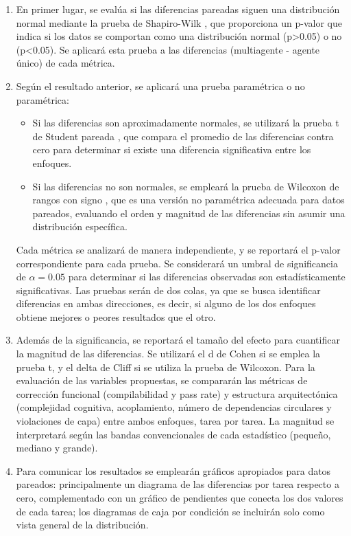 \begin{enumerate}
  \item En primer lugar, se evalúa si las diferencias pareadas siguen una distribución normal mediante la prueba de Shapiro-Wilk \parencite{shapiro1965analysis}, que proporciona un p-valor que indica si los datos se comportan como una distribución normal (p>0.05) o no (p<0.05). Se aplicará esta prueba a las diferencias (multiagente - agente único) de cada métrica.
  \item Según el resultado anterior, se aplicará una prueba paramétrica o no paramétrica:
  \begin{itemize}
    \item Si las diferencias son aproximadamente normales, se utilizará la prueba t de Student pareada \parencite{student1908probable}, que compara el promedio de las diferencias contra cero para determinar si existe una diferencia significativa entre los enfoques.
    \item Si las diferencias no son normales, se empleará la prueba de Wilcoxon de rangos con signo \parencite{wilcoxon1945individual}, que es una versión no paramétrica adecuada para datos pareados, evaluando el orden y magnitud de las diferencias sin asumir una distribución específica.
  \end{itemize}
  Cada métrica se analizará de manera independiente, y se reportará el p-valor correspondiente para cada prueba. Se considerará un umbral de significancia de $\alpha = 0.05$ para determinar si las diferencias observadas son estadísticamente significativas. Las pruebas serán de dos colas, ya que se busca identificar diferencias en ambas direcciones, es decir, si alguno de los dos enfoques obtiene mejores o peores resultados que el otro.
  \item Además de la significancia, se reportará el tamaño del efecto para cuantificar la magnitud de las diferencias. Se utilizará el d de Cohen \parencite{cohen1988statistical} si se emplea la prueba t, y el delta de Cliff \parencite{cliff1993dominance} si se utiliza la prueba de Wilcoxon. Para la evaluación de las variables propuestas, se compararán las métricas de corrección funcional (compilabilidad y pass rate) y estructura arquitectónica (complejidad cognitiva, acoplamiento, número de dependencias circulares y violaciones de capa) entre ambos enfoques, tarea por tarea. La magnitud se interpretará según las bandas convencionales de cada estadístico (pequeño, mediano y grande).
  \item Para comunicar los resultados se emplearán gráficos apropiados para datos pareados: principalmente un diagrama de las diferencias por tarea respecto a cero, complementado con un gráfico de pendientes que conecta los dos valores de cada tarea; los diagramas de caja por condición se incluirán solo como vista general de la distribución.
\end{enumerate}

